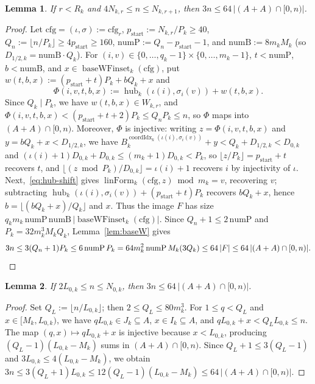 \documentclass[11pt,a4paper]{amsart}
\newtheorem{lemma}{Lemma}
\newcommand{\linForm}{\operatorname{linForm}}
\newcommand{\coordIdx}{\operatorname{coordIdx}}
\newcommand{\hub}{\operatorname{hub}}
\newcommand{\baseW}{\operatorname{baseWFinset}}
\begin{document}
\begin{lemma}\label{lem:scale-lb}
If $r < R_k$ and $4 N_{k,r} \le n \le N_{k,r+1}$, then $3 n \le 64 \, |(A + A) \cap [0, n)|$.
\end{lemma}

\begin{proof}
Let $\mathrm{cfg} = (\iota, \sigma) := \mathrm{cfg}_r$, $p_{\mathrm{start}} := N_{k,r} / P_k \ge 40$, $Q_n := \lfloor n / P_k \rfloor \ge 4 p_{\mathrm{start}} \ge 160$, $\mathrm{numP} := Q_n - p_{\mathrm{start}} - 1$, and $\mathrm{numB} := 8 m_k M_k$ (so $D_{1/2,k} = \mathrm{numB} \cdot Q_k$). For $(i, v) \in \{0, \dots, q_k - 1\} \times \{0, \dots, m_k - 1\}$, $t < \mathrm{numP}$, $b < \mathrm{numB}$, and $x \in \baseW_k(\mathrm{cfg})$, put $w(t, b, x) := (p_{\mathrm{start}} + t) P_k + b Q_k + x$ and
\[
\Phi(i, v, t, b, x) := \hub_k(\iota(i), \sigma_i(v)) + w(t, b, x).
\]
Since $Q_k \mid P_k$, we have $w(t, b, x) \in W_{k,r}$, and $\Phi(i, v, t, b, x) < (p_{\mathrm{start}} + t + 2) P_k \le Q_n P_k \le n$, so $\Phi$ maps into $(A + A) \cap [0, n)$. Moreover, $\Phi$ is injective: writing $z = \Phi(i, v, t, b, x)$ and $y = b Q_k + x < D_{1/2,k}$, we have $B_k^{\coordIdx_k(\iota(i), \sigma_i(v))} + y < Q_k + D_{1/2,k} < D_{0,k}$ and $(\iota(i) + 1) D_{0,k} + D_{0,k} \le (m_k + 1) D_{0,k} < P_k$, so $\lfloor z / P_k \rfloor = p_{\mathrm{start}} + t$ recovers $t$, and $\lfloor (z \bmod P_k) / D_{0,k} \rfloor = \iota(i) + 1$ recovers $i$ by injectivity of $\iota$. Next,~\eqref{eq:hub-shift} gives $\linForm_k(\mathrm{cfg}, z) \bmod m_k = v$, recovering $v$; subtracting $\hub_k(\iota(i), \sigma_i(v)) + (p_{\mathrm{start}} + t) P_k$ recovers $b Q_k + x$, hence $b = \lfloor (b Q_k + x) / Q_k \rfloor$ and $x$. Thus the image $F$ has size $q_k m_k \, \mathrm{numP} \, \mathrm{numB} \, |\baseW_k(\mathrm{cfg})|$. Since $Q_n + 1 \le 2 \, \mathrm{numP}$ and $P_k = 32 m_k^3 M_k Q_k$, Lemma~\ref{lem:baseW} gives
\[
3 n \le 3 (Q_n + 1) P_k \le 6 \, \mathrm{numP} \, P_k = 64 m_k^2 \, \mathrm{numP} \, M_k (3 Q_k) \le 64 \, |F| \le 64 \, |(A + A) \cap [0, n)|. \qedhere
\]
\end{proof}

\begin{lemma}\label{lem:bridge-lb}
If $2 L_{0,k} \le n \le N_{0,k}$, then $3 n \le 64 \, |(A + A) \cap [0, n)|$.
\end{lemma}

\begin{proof}
Set $Q_L := \lfloor n / L_{0,k} \rfloor$; then $2 \le Q_L \le 80 m_k^3$. For $1 \le q < Q_L$ and $x \in [M_k, L_{0,k})$, we have $q L_{0,k} \in J_k \subseteq A$, $x \in I_k \subseteq A$, and $q L_{0,k} + x < Q_L L_{0,k} \le n$. The map $(q, x) \mapsto q L_{0,k} + x$ is injective because $x < L_{0,k}$, producing $(Q_L - 1)(L_{0,k} - M_k)$ sums in $(A + A) \cap [0, n)$. Since $Q_L + 1 \le 3(Q_L - 1)$ and $3 L_{0,k} \le 4(L_{0,k} - M_k)$, we obtain $3 n \le 3(Q_L + 1) L_{0,k} \le 12(Q_L - 1)(L_{0,k} - M_k) \le 64 \, |(A + A) \cap [0, n)|$.
\end{proof}
\end{document}
